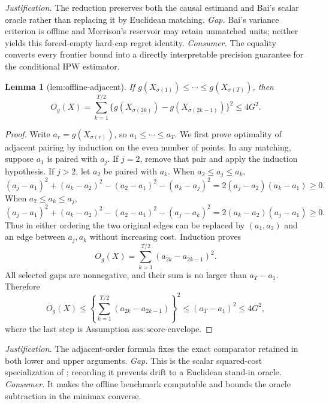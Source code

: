 \documentclass{article}
\newtheorem{lemma}{Lemma}
\begin{document}
\par\smallskip\noindent \textit{Justification.} The reduction preserves both the causal estimand and Bai's scalar oracle rather than replacing it by Euclidean matching. \textit{Gap.} Bai's variance criterion is offline and Morrison's reservoir may retain unmatched units; neither yields this forced-empty hard-cap regret identity. \textit{Consumer.} The equality converts every frontier bound into a directly interpretable precision guarantee for the conditional IPW estimator.

\begin{lemma}[lem:offline-adjacent]\label{lem:offline-adjacent}
If \(g(X_{\sigma(1)})\le\cdots\le g(X_{\sigma(T)})\), then \[O_g(X)=\sum_{k=1}^{T/2}\{g(X_{\sigma(2k)})-g(X_{\sigma(2k-1)})\}^2\le4G^2.\]
\end{lemma}
\begin{proof}
Write \(a_r=g(X_{\sigma(r)})\), so \(a_1\le\cdots\le a_T\).  We first prove optimality of adjacent pairing by induction on the even number of points.  In any matching, suppose \(a_1\) is paired with \(a_j\).  If \(j=2\), remove that pair and apply the induction hypothesis.  If \(j>2\), let \(a_2\) be paired with \(a_k\).  When \(a_2\le a_j\le a_k\),
\[
(a_j-a_1)^2+(a_k-a_2)^2-(a_2-a_1)^2-(a_k-a_j)^2
=2(a_j-a_2)(a_k-a_1)\ge0.
\]
When \(a_2\le a_k\le a_j\),
\[
(a_j-a_1)^2+(a_k-a_2)^2-(a_2-a_1)^2-(a_j-a_k)^2
=2(a_k-a_2)(a_j-a_1)\ge0.
\]
Thus in either ordering the two original edges can be replaced by \((a_1,a_2)\) and an edge between \(a_j,a_k\) without increasing cost.  Induction proves
\[
O_g(X)=\sum_{k=1}^{T/2}(a_{2k}-a_{2k-1})^2.
\]
All selected gaps are nonnegative, and their sum is no larger than \(a_T-a_1\).  Therefore
\[
O_g(X)\le\left\{\sum_{k=1}^{T/2}(a_{2k}-a_{2k-1})\right\}^2
\le(a_T-a_1)^2\le4G^2,
\]
where the last step is Assumption \(\mathrm{ass:score\text{-}envelope}\).
\end{proof}
\par\smallskip\noindent \textit{Justification.} The adjacent-order formula fixes the exact comparator retained in both lower and upper arguments. \textit{Gap.} This is the scalar squared-cost specialization of \cite{bai2022optimality}; recording it prevents drift to a Euclidean stand-in oracle. \textit{Consumer.} It makes the offline benchmark computable and bounds the oracle subtraction in the minimax converse.
\end{document}
